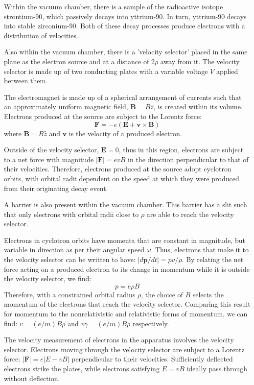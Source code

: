 Within the vacuum chamber, there is a sample of the radioactive isotope strontium-90,
which passively decays into yttrium-90. In turn, yttrium-90 decays into stable
zirconium-90. Both of these decay processes produce electrons with a distribution of velocities.


Also within the vacuum chamber, there is a 'velocity selector' placed in the same plane as the electron source and at a distance of $2\rho$ away from it.
The velocity selector is made up of two conducting plates with a variable voltage $V$ applied between them.

The electromagnet is made up of a spherical arrangement of currents such that
an approximately uniform magnetic field, $\bm{B}=B\hat{z}$, is created within its volume.
Electrons produced at the source are subject to the Lorentz force:
$$\bm{F}=-e(\bm{E}+\bm{v} \times \bm{B})$$
where $\bm{B}=B\hat{z}$ and $\bm{v}$ is the velocity of a produced electron.

Outside of the velocity selector, $\bm{E}=0$, thus in this region, electrons are subject to a net force with magnitude
$|\bm{F}|=evB$ in the direction perpendicular to that of their velocities. Therefore, electrons produced at the source
adopt cyclotron orbits, with orbital radii dependent on the speed at which they
were produced from their originating decay event.

A barrier is also present within the vacuum chamber. This barrier has a slit such that only electrons with orbital
radii close to $\rho$ are able to reach the velocity selector.

Electrons in cyclotron orbits have momenta that are constant in magnitude, but variable in direction
as per their angular speed $\omega$. Thus, electrons that make it to the velocity selector can be written to have:
$\left\lvert d\bm{p}/dt\right\rvert=pv/\rho$.
By relating the net force acting on a produced electron to its change in momentum while it is outside the velocity selector, we find:
$$p=e \rho B$$
Therefore, with a constrained orbital radius $\rho$, the choice of $B$ selects the momentum of the electrons that reach
the velocity selector. Comparing this result for momentum to the nonrelativistic and relativistic forms of momentum, we can find:
$v=(e/m)B\rho$ and $v\gamma =(e/m) B\rho$ respectively.


The velocity measurement of electrons in the apparatus involves the velocity selector. Electrons moving through
the velocity selector are subject to a Lorentz force: $|\bm{F}|=e|E-vB|$ perpendicular to their velocities.
Sufficiently deflected electrons strike the plates, while electrons satisfying $E=vB$ ideally pass through without deflection.

